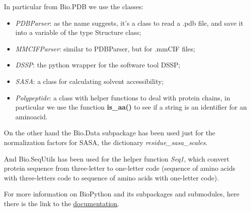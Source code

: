 In particular from Bio.PDB we use the classes:
\begin{itemize}
    \item \textit{PDBParser}: as the name suggests, it's a class to read a .pdb file, and save it into a variable of the type Structure class;
    \item \textit{MMCIFParser}: similar to PDBParser, but for .mmCIF files;
    \item \textit{DSSP}: the python wrapper for the software tool DSSP;
    \item \textit{SASA}: a class for calculating solvent accessibility;
    \item \textit{Polypeptide}: a class with helper functions to deal with protein chains, in particular we use the function \textbf{is\_aa()} to see if a string is an identifier for an aminoacid.
\end{itemize}

On the other hand the Bio.Data subpackage has been used just for the normalization factors for SASA, the dictionary \textit{residue\_sasa\_scales}. 

And Bio.SeqUtils has been used for the helper function \textit{Seq1}, which convert protein sequence from three-letter to one-letter code (sequence of amino acids with three-letters code to sequence of amino acids with one-letter code).

For more information on BioPython and its subpackages and submodules, here there is the link to the  \underline{\href{https://biopython.org/docs/dev/api/index.html}{documentation}}.